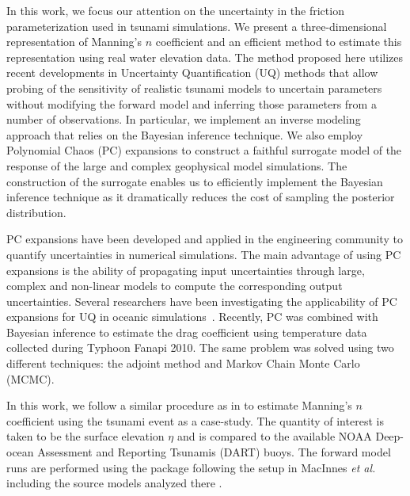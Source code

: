 In this work, we focus our attention on the uncertainty in the friction
parameterization used in tsunami simulations. We present a three-dimensional 
representation of Manning's $n$ coefficient and an efficient method
to estimate this representation using real water elevation data. The method proposed here utilizes recent 
developments in Uncertainty Quantification (UQ) methods that allow 
probing of the sensitivity of realistic tsunami  models to uncertain parameters
without modifying the forward model and inferring those parameters
from a number of observations.  In particular, we implement an inverse modeling
approach that relies on the Bayesian inference technique.  We also employ
Polynomial Chaos (PC) expansions to construct a faithful surrogate model of the
response of the large and complex geophysical model simulations.  The
construction of the surrogate enables us to efficiently implement the Bayesian
inference technique as it dramatically reduces the cost of sampling the
posterior distribution.

PC expansions have been developed and applied in the engineering community to
quantify uncertainties in numerical simulations.  The main advantage of
using PC expansions is the ability of propagating input uncertainties through 
large, complex and non-linear models to compute the corresponding output uncertainties. 
Several researchers have been investigating the applicability of PC expansions for 
UQ in oceanic simulations~\citep{thacker2012,ashwanth2010,Alexanderian2012}. 
Recently, PC was combined with Bayesian inference to estimate the drag coefficient 
using temperature data collected during Typhoon Fanapi 2010. The same problem was 
solved using two different techniques: the adjoint method and Markov Chain Monte Carlo
(MCMC)\cite{sraj:2013a,sraj:2013b}.

In this work, we follow a similar procedure as in \cite{sraj:2013a,sraj:2013b}
to estimate Manning's $n$ coefficient using the \tohoku tsunami
event as a case-study. The quantity of interest is taken to be the surface
elevation $\eta$ and is compared to the available NOAA Deep-ocean Assessment and
Reporting Tsunamis (DART) buoys.  The forward model runs are performed using the
\geoclaw package following the setup in MacInnes \emph{et al.} including the
source models analyzed there \cite{MacInnes:2013cr}.

